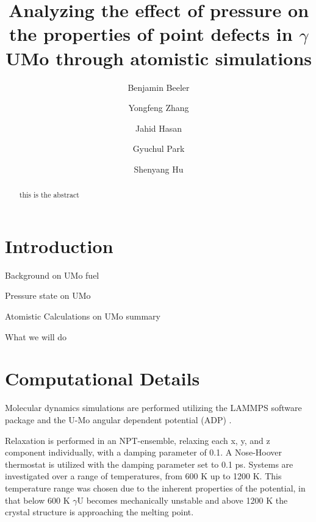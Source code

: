 \documentclass[11pt, oneside]{elsarticle}   	%
\date{}							%
\begin{document}
\begin{frontmatter}

\title{Analyzing the effect of pressure on the properties of point defects in $\gamma$UMo through atomistic simulations}

\author[ncsu,inl]{Benjamin Beeler}
\author[wisc]{Yongfeng Zhang}
\author[ncsu]{Jahid Hasan}
\author[purdue]{Gyuchul Park}
\author[pnnl]{Shenyang Hu}
\address[ncsu]{North Carolina State University, Raleigh, NC 27695}
\address[inl]{Idaho National Laboratory, Idaho Falls, ID 83415}
\address[wisc]{University of Wisconsin-Madison, Madison, WI 53715}
\address[purdue]{Purdue University, XXXXX}
\address[pnnl]{Pacific Northwest National Laboratory, Idaho Falls, ID 83415}



\begin{abstract}
this is the abstract
\end{abstract}

\end{frontmatter}

\linenumbers
\modulolinenumbers[2]

\section{Introduction}

Background on UMo fuel

Pressure state on UMo

Atomistic Calculations on UMo summary

What we will do

\section{Computational Details}
Molecular dynamics simulations are performed utilizing the LAMMPS \cite{plimpton1995} software package and the U-Mo angular dependent potential (ADP) \cite{smirnovaADP}. 





Relaxation is performed in an NPT-ensemble, relaxing each x, y, and z component individually, with a damping parameter of 0.1. A Nose-Hoover thermostat is utilized with the damping parameter set to 0.1 ps. Systems are investigated over a range of temperatures, from 600 K up to 1200 K. This temperature range was chosen due to the inherent properties of the potential, in that below 600 K $\gamma$U becomes mechanically unstable and above 1200 K the crystal structure is approaching the melting point. 
\end{document}
